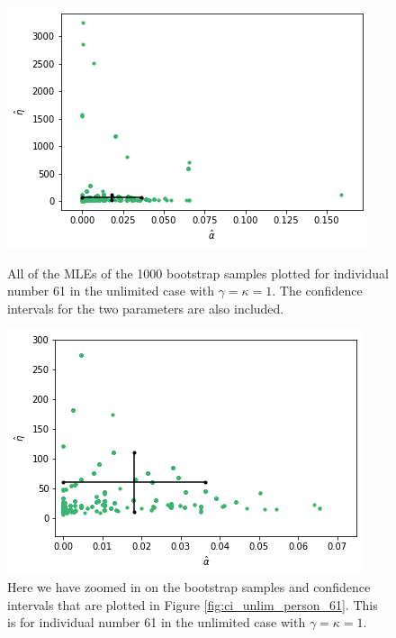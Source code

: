\begin{figure}
    \centering
    \begin{minipage}{0.48\textwidth}
        \centering
        \includegraphics[scale=0.37]{pictures/ci_unlim_person61.png}
        \caption[MLEs of bootstrap samples individual 61, unlimited]{All of the MLEs of the 1000 bootstrap samples plotted for individual number 61 in the unlimited case with $\gamma=\kappa=1$. The confidence intervals for the two parameters are also included.}
        \label{fig:ci_unlim_person_61}
    \end{minipage}\hfill
    \begin{minipage}{0.48\textwidth}
        \centering
        \includegraphics[scale=0.37]{pictures/ci_unlim_person61_zoomed.png}
        \caption[MLEs of bootstrap samples individual 61, unlimited, zoomed]{Here we have zoomed in on the bootstrap samples and confidence intervals that are plotted in Figure \ref{fig:ci_unlim_person_61}. This is for individual number 61 in the unlimited case with $\gamma=\kappa=1$.}
        \label{fig:ci_unlim_person_61_zoomed}
    \end{minipage}
\end{figure}

